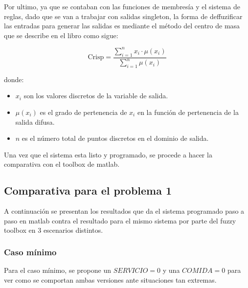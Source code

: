\documentclass[11pt, letterpaper]{article}
\begin{document}
\newpage

Por ultimo, ya que se contaban con las funciones de membresía y el sistema de reglas, dado que se van a trabajar con salidas singleton, la forma de deffuzificar las entradas para generar las salidas es mediante el método del centro de masa que se describe en el libro como sigue:


$$
\text{Crisp} = \frac{\sum_{i=1}^{n} x_i \cdot \mu(x_i)}{\sum_{i=1}^{n} \mu(x_i)}
$$

donde:

\begin{itemize}
	\item \( x_i \) son los valores discretos de la variable de salida.
	\item \( \mu(x_i) \) es el grado de pertenencia de \( x_i \) en la función de pertenencia de la salida difusa.
	\item \( n \) es el número total de puntos discretos en el dominio de salida.
\end{itemize}

Una vez que el sistema esta listo y programado, se procede a hacer la comparativa con el toolbox de matlab.

\newpage

\subsection{Comparativa para el problema 1}

A continuación se presentan los resultados que da el sistema programado paso a paso en matlab contra el resultado para el mismo sistema por parte del fuzzy toolbox en 3 escenarios distintos.

\subsubsection{Caso mínimo}

Para el caso mínimo, se propone un $SERVICIO = 0$ y una $COMIDA = 0$ para ver como se comportan ambas versiones ante situaciones tan extremas.
\end{document}

